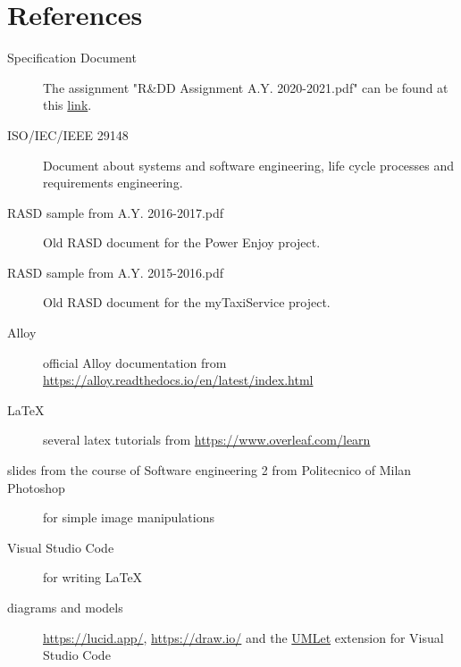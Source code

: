 \section{References}
\begin{description}
    \item [Specification Document] The assignment "R\&DD Assignment A.Y. 2020-2021.pdf" can be found at this \href{https://github.com/LudoLe/LermaMainettiGambera/blob/master/other%20documents/R%26DD%20Assignment%20A.Y.%202020-2021%20(2).pdf}{link}.
    \item [ISO/IEC/IEEE 29148] Document about systems and software engineering, life cycle processes and requirements engineering.
    \item [RASD sample from A.Y. 2016-2017.pdf] Old RASD document for the Power Enjoy project.
    \item [RASD sample from A.Y. 2015-2016.pdf] Old RASD document for the myTaxiService project.
    \item [Alloy] official Alloy documentation from \url{https://alloy.readthedocs.io/en/latest/index.html}
    \item [\LaTeX{}] several latex tutorials from \url{https://www.overleaf.com/learn}
    \item [slides from the course of Software engineering 2 from Politecnico of Milan] 
    \item [Photoshop] for simple image manipulations
    \item [Visual Studio Code] for writing \LaTeX
    \item [diagrams and models] \url{https://lucid.app/}, \url{https://draw.io/} and the \href{https://marketplace.visualstudio.com/items?itemName=TheUMLetTeam.umlet}{UMLet} extension for Visual Studio Code
\end{description}